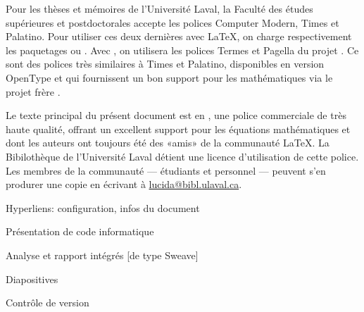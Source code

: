 Pour les thèses et mémoires de l'Université Laval, la Faculté des
études supérieures et postdoctorales accepte les polices %
{\selectfont Computer Modern}, %
{\selectfont Times} et %
{\selectfont Palatino}. Pour utiliser ces deux
dernières avec {\LaTeX}, on charge respectivement les paquetages
 ou . Avec {\XeLaTeX}, on utilisera les
polices {\selectfont Termes} et
{\selectfont Pagella} du projet %
.
Ce sont des polices très similaires à Times et Palatino, disponibles
en version OpenType et qui fournissent un bon support pour les
mathématiques via le projet frère %
.

Le texte principal du présent document est en %
, %
une police commerciale de très haute qualité, offrant un excellent
support pour les équations mathématiques et dont les auteurs ont
toujours été des «amis» de la communauté {\LaTeX}. La Bibilothèque de
l'Université Laval détient une licence d'utilisation de cette police.
Les membres de la communauté --- étudiants et personnel --- peuvent
s'en produrer une copie en écrivant à
\href{mailto:lucida@bibl.ulaval.ca}{lucida@bibl.ulaval.ca}.

Hyperliens: configuration, infos du document

Présentation de code informatique

Analyse et rapport intégrés [de type Sweave]

Diapositives

Contrôle de version

